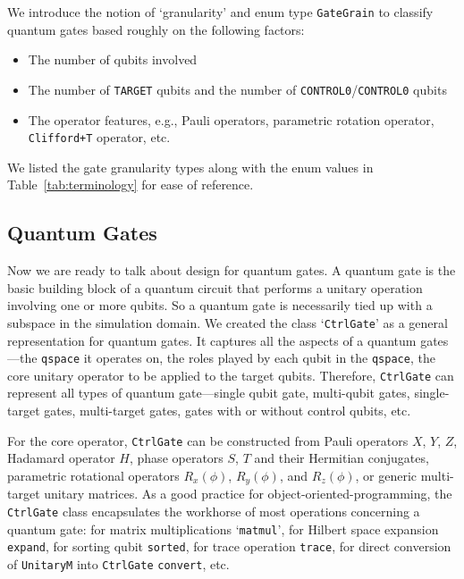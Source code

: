 \documentclass[a4paper,titlepage]{article}
\begin{document}
    We introduce the notion of `granularity' and enum type \texttt{GateGrain} to classify quantum gates based roughly on the following factors:
    \begin{itemize}
        \item The number of qubits involved
        \item The number of \texttt{TARGET} qubits and the number of \texttt{CONTROL0}/\texttt{CONTROL0} qubits
        \item The operator features, e.g., Pauli operators, parametric rotation operator, \texttt{Clifford+T} operator, etc.
    \end{itemize}
    We listed the gate granularity types along with the enum values in Table~\ref{tab:terminology} for ease of reference.

    \subsection{Quantum Gates}\label{subsec:quantum-gates}

    Now we are ready to talk about design for quantum gates.
    A quantum gate is the basic building block of a quantum circuit that performs a unitary operation involving one or more qubits.
    So a quantum gate is necessarily tied up with a subspace in the simulation domain.
    We created the class `\texttt{CtrlGate}' as a general representation for quantum gates.
    It captures all the aspects of a quantum gates---the \texttt{qspace} it operates on, the roles played by each qubit in the \texttt{qspace},
    the core unitary operator to be applied to the target qubits.
    Therefore, \texttt{CtrlGate} can represent all types of quantum gate---single qubit gate, multi-qubit gates,
    single-target gates, multi-target gates, gates with or without control qubits, etc.


    For the core operator, \texttt{CtrlGate} can be constructed from Pauli operators $X$, $Y$, $Z$, Hadamard operator $H$, phase operators $S$, $T$
    and their Hermitian conjugates, parametric rotational operators $R_x(\phi)$, $R_y(\phi)$, and $R_z(\phi)$, or generic multi-target unitary matrices.
    As a good practice for object-oriented-programming, the \texttt{CtrlGate} class encapsulates the workhorse of most operations concerning a quantum gate:
    for matrix multiplications `\texttt{matmul}', for Hilbert space expansion \texttt{expand}, for sorting qubit \texttt{sorted},
    for trace operation \texttt{trace}, for direct conversion of \texttt{UnitaryM} into \texttt{CtrlGate} \texttt{convert}, etc.
\end{document}
